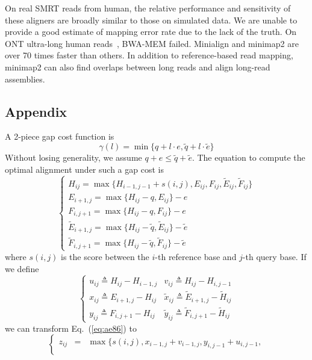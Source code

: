 \documentclass{bioinfo}
\begin{document}
On real SMRT reads from human, the relative performance and sensitivity of
these aligners are broadly similar to those on simulated data. We are unable to
provide a good estimate of mapping error rate due to the lack of the truth.  On
ONT ultra-long human reads~\citep{Jain128835}, BWA-MEM failed. Minialign and
minimap2 are over 70 times faster than others. In addition to reference-based
read mapping, minimap2 can also find overlaps between long reads and align
long-read assemblies.



\pagebreak

\begin{methods}
\section*{Appendix}
A 2-piece gap cost function is
\[
\gamma(l)=\min\{q+l\cdot e,\tilde{q}+l\cdot\tilde{e}\}
\]
Without losing generality, we assume $q+e\le\tilde{q}+\tilde{e}$. The equation
to compute the optimal alignment under such a gap cost is
\begin{equation}\label{eq:ae86}
\left\{\begin{array}{l}
H_{ij} = \max\{H_{i-1,j-1}+s(i,j),E_{ij},F_{ij},\tilde{E}_{ij},\tilde{F}_{ij}\}\\
E_{i+1,j}= \max\{H_{ij}-q,E_{ij}\}-e\\
F_{i,j+1}= \max\{H_{ij}-q,F_{ij}\}-e\\
\tilde{E}_{i+1,j}= \max\{H_{ij}-\tilde{q},\tilde{E}_{ij}\}-\tilde{e}\\
\tilde{F}_{i,j+1}= \max\{H_{ij}-\tilde{q},\tilde{F}_{ij}\}-\tilde{e}
\end{array}\right.
\end{equation}
where $s(i,j)$ is the score between the $i$-th reference base and $j$-th query
base. If we define
\[
\left\{\begin{array}{ll}
u_{ij}\triangleq H_{ij}-H_{i-1,j} & v_{ij}\triangleq H_{ij}-H_{i,j-1} \\
x_{ij}\triangleq E_{i+1,j}-H_{ij} & \tilde{x}_{ij}\triangleq \tilde{E}_{i+1,j}-\tilde{H}_{ij} \\
y_{ij}\triangleq F_{i,j+1}-H_{ij} & \tilde{y}_{ij}\triangleq \tilde{F}_{i,j+1}-\tilde{H}_{ij}
\end{array}\right.
\]
we can transform Eq.~(\ref{eq:ae86}) to
\begin{equation}\label{eq:suzuki}
\left\{\begin{array}{lll}
z_{ij}&=&\max\{s(i,j),x_{i-1,j}+v_{i-1,j},y_{i,j-1}+u_{i,j-1},\\

\end{array}
\end{equation}
\end{methods}
\end{document}
